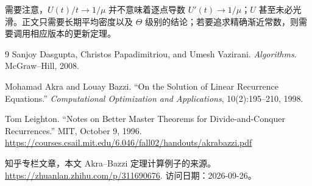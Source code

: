 \documentclass[11pt,a4paper]{article}
\begin{document}
需要注意，$U(t)/t\to1/\mu$ 并不意味着逐点导数 $U'(t)\to1/\mu$；$U$ 甚至未必光滑。正文只需要长期平均密度以及 $\Theta$ 级别的结论；若要追求精确渐近常数，则需要调用相应版本的更新定理。

\begin{thebibliography}{9}
Sanjoy Dasgupta, Christos Papadimitriou, and Umesh Vazirani.
\emph{Algorithms}. McGraw--Hill, 2008.

Mohamad Akra and Louay Bazzi.
``On the Solution of Linear Recurrence Equations.''
\emph{Computational Optimization and Applications}, 10(2):195--210, 1998.

Tom Leighton.
``Notes on Better Master Theorems for Divide-and-Conquer Recurrences.''
MIT, October 9, 1996.
\url{https://courses.csail.mit.edu/6.046/fall02/handouts/akrabazzi.pdf}

知乎专栏文章，本文 Akra--Bazzi 定理计算例子的来源。
\url{https://zhuanlan.zhihu.com/p/311690676}.
访问日期：2026-09-26。
\end{thebibliography}
\end{document}
